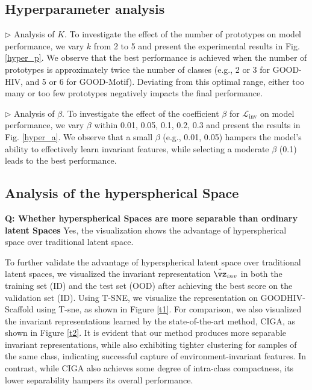 \subsection{Hyperparameter analysis}
 \noindent$\rhd$ \textsf{Analysis of $K$.}
 To investigate the effect of the number of prototypes on model performance, we vary $k$ from 2 to 5 and present the experimental results in Fig. \ref{hyper_p}. We observe that the best performance is achieved when the number of prototypes is approximately twice the number of classes (e.g., 2 or 3 for GOOD-HIV, and 5 or 6 for GOOD-Motif). Deviating from this optimal range, either too many or too few prototypes negatively impacts the final performance.
 
  \noindent$\rhd$ \textsf{Analysis of $\beta$.}
  To investigate the effect of the coefficient $\beta$ for $\mathcal{L}_{\mathrm{inv}}$ on model performance, we vary $\beta$ within {0.01, 0.05, 0.1, 0.2, 0.3} and present the results in Fig. \ref{hyper_a}. We observe that a small $\beta$ (e.g., 0.01, 0.05) hampers the model’s ability to effectively learn invariant features, while selecting a moderate $\beta$ (0.1) leads to the best performance.

\subsection{Analysis of the hyperspherical Space}
\textbf{Q: Whether hyperspherical Spaces are more separable than ordinary latent Spaces} Yes, the visualization shows the advantage of hyperspherical space over traditional latent space.

To further validate the advantage of hyperspherical latent space over traditional latent spaces, we visualized the invariant representation 
$\hat{\vz}_{inv}$ in both the training set (ID) and the test set (OOD) after achieving the best score on the validation set (ID). Using T-SNE, we visualize the representation on GOODHIV-Scaffold using T-sne, as shown in Figure \ref{t1}. For comparison, we also visualized the invariant representations learned by the state-of-the-art method, CIGA, as shown in Figure \ref{t2}. It is evident that our method produces more separable invariant representations, while also exhibiting tighter clustering for samples of the same class, indicating successful capture of environment-invariant features. In contrast, while CIGA also achieves some degree of intra-class compactness, its lower separability hampers its overall performance.

